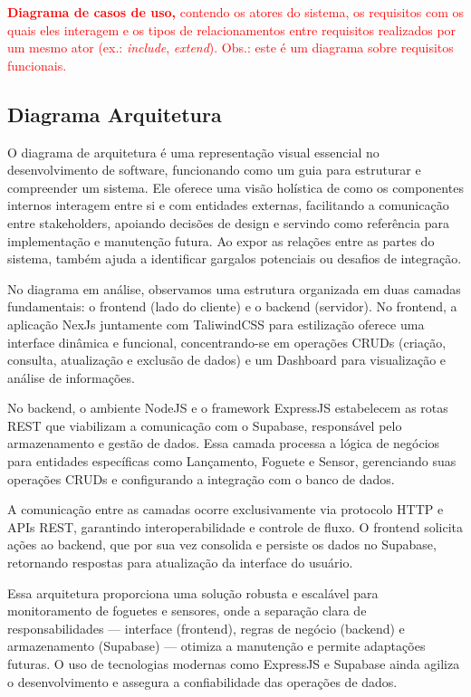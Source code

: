 \textcolor{red}{ \textbf{Diagrama de casos de uso,} contendo os atores do sistema, os requisitos com os quais eles interagem e os tipos de relacionamentos entre requisitos realizados por um mesmo ator (ex.: \textit{include}, \textit{extend}). Obs.: este é um diagrama sobre requisitos funcionais.}
    
    
  \subsection{Diagrama Arquitetura}
  O diagrama de arquitetura é uma representação visual essencial no desenvolvimento de software, funcionando como um guia para estruturar e compreender um sistema. Ele oferece uma visão holística de como os componentes internos interagem entre si e com entidades externas, facilitando a comunicação entre stakeholders, apoiando decisões de design e servindo como referência para implementação e manutenção futura. Ao expor as relações entre as partes do sistema, também ajuda a identificar gargalos potenciais ou desafios de integração.

No diagrama em análise, observamos uma estrutura organizada em duas camadas fundamentais: o frontend (lado do cliente) e o backend (servidor). No frontend, a aplicação NexJs juntamente com TaliwindCSS para estilização oferece uma interface dinâmica e funcional, concentrando-se em operações CRUDs (criação, consulta, atualização e exclusão de dados) e um Dashboard para visualização e análise de informações.

No backend, o ambiente NodeJS e o framework ExpressJS estabelecem as rotas REST que viabilizam a comunicação com o Supabase, responsável pelo armazenamento e gestão de dados. Essa camada processa a lógica de negócios para entidades específicas como Lançamento, Foguete e Sensor, gerenciando suas operações CRUDs e configurando a integração com o banco de dados.

A comunicação entre as camadas ocorre exclusivamente via protocolo HTTP e APIs REST, garantindo interoperabilidade e controle de fluxo. O frontend solicita ações ao backend, que por sua vez consolida e persiste os dados no Supabase, retornando respostas para atualização da interface do usuário.

Essa arquitetura proporciona uma solução robusta e escalável para monitoramento de foguetes e sensores, onde a separação clara de responsabilidades — interface (frontend), regras de negócio (backend) e armazenamento (Supabase) — otimiza a manutenção e permite adaptações futuras. O uso de tecnologias modernas como ExpressJS e Supabase ainda agiliza o desenvolvimento e assegura a confiabilidade das operações de dados.

